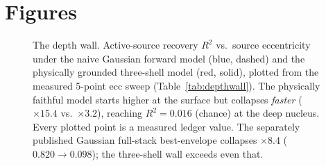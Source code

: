 \documentclass[11pt]{article}
\newcommand{\Rsq}{R^{2}}
\begin{document}
\section{Figures}
\label{sec:figures}

\begin{figure}[h]
\centering
{}
\caption{The depth wall. Active-source recovery $\Rsq$ vs.\ source eccentricity under
the naive Gaussian forward model (blue, dashed) and the physically grounded
three-shell model (red, solid), plotted from the measured 5-point ecc sweep
(Table~\ref{tab:depthwall}). The physically faithful model starts higher at the
surface but collapses \emph{faster} ($\times 15.4$ vs.\ $\times 3.2$), reaching
$\Rsq=0.016$ (chance) at the deep nucleus. Every plotted point is a measured ledger
value. The separately published Gaussian full-stack best-envelope collapses
$\times 8.4$ ($0.820\to0.098$); the three-shell wall exceeds even that.}
\label{fig:wall}
\end{figure}
\end{document}
